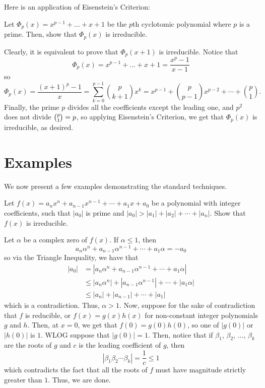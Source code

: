 \documentclass[11pt]{scrartcl}
\begin{document}
Here is an application of Eisenstein's Criterion:

\begin{example*}
Let $\Phi_p(x) = x^{p-1}+\dots+x+1$ be the $p$th cyclotomic polynomial where $p$ is a prime. Then, show that $\Phi_p(x)$ is irreducible.
\end{example*}

Clearly, it is equivalent to prove that $\Phi_p(x+1)$ is irreducible. Notice that \[\Phi_p(x) = x^{p-1}+\dots+x+1 = \dfrac{x^p-1}{x-1}\] so \[\Phi_p(x) = \dfrac{(x+1)^p-1}{x} = \sum_{k=0}^{p-1} \binom{p}{k+1}x^k = x^{p-1}+\binom{p}{p-1}x^{p-2}+\cdots+\binom{p}{1}.\] Finally, the prime $p$ divides all the coefficients except the leading one, and $p^2$ does not divide $\tbinom{p}{1} = p$, so applying Eisenstein's Criterion, we get that $\Phi_p(x)$ is irreducible, as desired.

\section{Examples}

We now present a few examples demonstrating the standard techniques.

\begin{example*}
Let $f(x) = a_nx^n + a_{n-1}x^{n-1} + \cdots + a_1x + a_0$ be a polynomial with integer coefficients, such that $|a_0|$ is prime and $|a_0| > |a_1| + |a_2| + \cdots + |a_n|$. Show that $f(x)$ is irreducible.
\end{example*}

Let $\alpha$ be a complex zero of $f(x)$. If $\alpha \le 1$, then \[a_n\alpha^n+a_{n-1}\alpha^{n-1}+\cdots+a_1\alpha = -a_0\] so via the Triangle Inequality, we have that
\begin{align*}
|a_0| &= |a_n\alpha^n+a_{n-1}\alpha^{n-1}+\cdots+a_1\alpha| \\
&\le |a_n\alpha^n|+|a_{n-1}\alpha^{n-1}|+\cdots+|a_1\alpha| \\
&\le |a_n|+|a_{n-1}|+\cdots+|a_1|
\end{align*}
which is a contradiction. Thus, $\alpha > 1$. Now, suppose for the sake of contradiction that $f$ is reducible, or $f(x) = g(x)h(x)$ for non-constant integer polynomials $g$ and $h$. Then, at $x = 0$, we get that $f(0) = g(0)h(0)$, so one of $|g(0)|$ or $|h(0)|$ is $1$. WLOG suppose that $|g(0)| = 1$. Then, notice that if $\beta_1$, $\beta_2$, $\dots$, $\beta_k$ are the roots of $g$ and $c$ is the leading coefficient of $g$, then \[|\beta_1\beta_2\cdots \beta_k| = \dfrac{1}{c} \le 1\] which contradicts the fact that all the roots of $f$ must have magnitude strictly greater than $1$. Thus, we are done.
\end{document}
